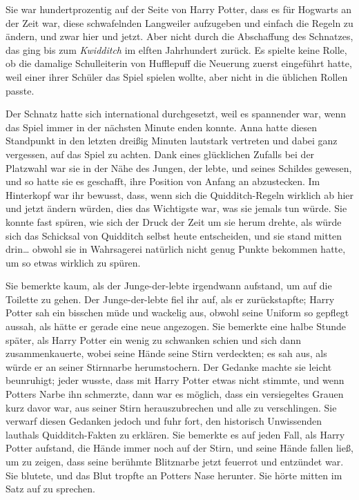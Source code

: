 {Sie war hundertprozentig auf der Seite von Harry Potter, dass es für Hogwarts an der Zeit war, diese schwafelnden Langweiler aufzugeben und einfach die Regeln zu ändern, und zwar hier und jetzt. Aber nicht durch die Abschaffung des Schnatzes, das ging bis zum \emph{Kwidditch} im elften Jahrhundert zurück. Es spielte keine Rolle, ob die damalige Schulleiterin von Hufflepuff die Neuerung zuerst eingeführt hatte, weil einer ihrer Schüler das Spiel spielen wollte, aber nicht in die üblichen Rollen passte.

Der Schnatz hatte sich international durchgesetzt, weil es spannender war, wenn das Spiel immer in der nächsten Minute enden konnte. Anna hatte diesen Standpunkt in den letzten dreißig Minuten lautstark vertreten und dabei ganz vergessen, auf das Spiel zu achten. Dank eines glücklichen Zufalls bei der Platzwahl war sie in der Nähe des Jungen, der lebte, und seines Schildes gewesen, und so hatte sie es geschafft, ihre Position von Anfang an abzustecken. Im Hinterkopf war ihr bewusst, dass, wenn sich die Quidditch-Regeln wirklich ab hier und jetzt ändern würden, dies das Wichtigste war, was sie jemals tun würde. Sie konnte fast spüren, wie sich der Druck der Zeit um sie herum drehte, als würde sich das Schicksal von Quidditch selbst heute entscheiden, und sie stand mitten drin… obwohl sie in Wahrsagerei natürlich nicht genug Punkte bekommen hatte, um so etwas wirklich zu spüren.

Sie bemerkte kaum, als der Junge-der-lebte irgendwann aufstand, um auf die Toilette zu gehen. Der Junge-der-lebte fiel ihr auf, als er zurückstapfte; Harry Potter sah ein bisschen müde und wackelig aus, obwohl seine Uniform so gepflegt aussah, als hätte er gerade eine neue angezogen. Sie bemerkte eine halbe Stunde später, als Harry Potter ein wenig zu schwanken schien und sich dann zusammenkauerte, wobei seine Hände seine Stirn verdeckten; es sah aus, als würde er an seiner Stirnnarbe herumstochern. Der Gedanke machte sie leicht beunruhigt; jeder wusste, dass mit Harry Potter etwas nicht stimmte, und wenn Potters Narbe ihn schmerzte, dann war es möglich, dass ein versiegeltes Grauen kurz davor war, aus seiner Stirn herauszubrechen und alle zu verschlingen. Sie verwarf diesen Gedanken jedoch und fuhr fort, den historisch Unwissenden lauthals Quidditch-Fakten zu erklären. Sie bemerkte es auf jeden Fall, als Harry Potter aufstand, die Hände immer noch auf der Stirn, und seine Hände fallen ließ, um zu zeigen, dass seine berühmte Blitznarbe jetzt feuerrot und entzündet war. Sie blutete, und das Blut tropfte an Potters Nase herunter. Sie hörte mitten im Satz auf zu sprechen.

}
